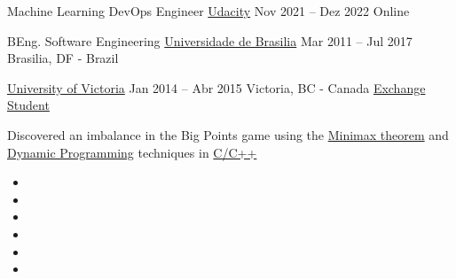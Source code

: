 \par
{}

\cveducation
{\normalsize Machine Learning DevOps Engineer}
{\href{https://confirm.udacity.com/VWERCDCT}{Udacity}}
{Nov 2021 -- Dez 2022}
{Online}
{}

\bigskip

\cveducation
{\normalsize BEng. Software Engineering}
{\href{https://fga.unb.br/software}{Universidade de Brasilia}}
{Mar 2011 -- Jul 2017}
{Brasilia, DF - Brazil}
{}

\smallskip

\cveducation
{}
{\href{https://www.uvic.ca/}{University of Victoria}}
{Jan 2014 -- Abr 2015}
{Victoria, BC - Canada}
{\href{http://www.cienciasemfronteiras.gov.br/web/csf/o-programa}{Exchange Student}}
\smallskip


\bigskip



{\smallskip\justifying
{\color{description}
Discovered an imbalance in the Big Points game
using the \href{https://en.wikipedia.org/wiki/Minimax_theorem}{Minimax theorem}
and \href{https://en.wikipedia.org/wiki/Dynamic_programming}{Dynamic Programming} techniques in {\color{link}\href{https://www.cplusplus.com/}{C/C++}}}
\par}

\bigskip


\begin{itemize}
\item[\scriptsize\color{tech}\faComments] 
\item[\scriptsize\color{tech}\faComments] \par
\divider
\item[\scriptsize\color{tech}\faCode] 
\item[\scriptsize\color{tech}\faCode] 
\item[\scriptsize\color{tech}\faCode] 
\item[\scriptsize\color{tech}\faCode] \par
\end{itemize}

